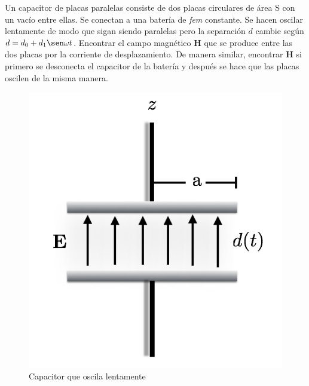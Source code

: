 \documentclass[11pt,fleqn]{book} %
\begin{document}
\begin{example}
Un capacitor de placas paralelas consiste de dos placas circulares de \'area S con un vac\'io entre ellas. Se conectan a una bater\'ia de \emph{fem} constante. Se hacen oscilar lentamente de modo que sigan siendo paralelas pero la separaci\'on $d$ cambie seg\'un $d=d_{0}+d_{1}\sen\omega t$. Encontrar el campo magn\'etico $\textbf{H}$ que se produce entre las dos placas por la corriente de desplazamiento. De manera similar, encontrar $\textbf{H}$ si primero se desconecta el capacitor de la bater\'ia y despu\'es se hace que las placas oscilen de la misma manera.
\begin{figure}[hbtp]
\centering
\includegraphics[scale=0.50]{Pictures/ConVariablet.png}
\caption{Capacitor que oscila lentamente}
\end{figure}


\end{example}
\end{document}
